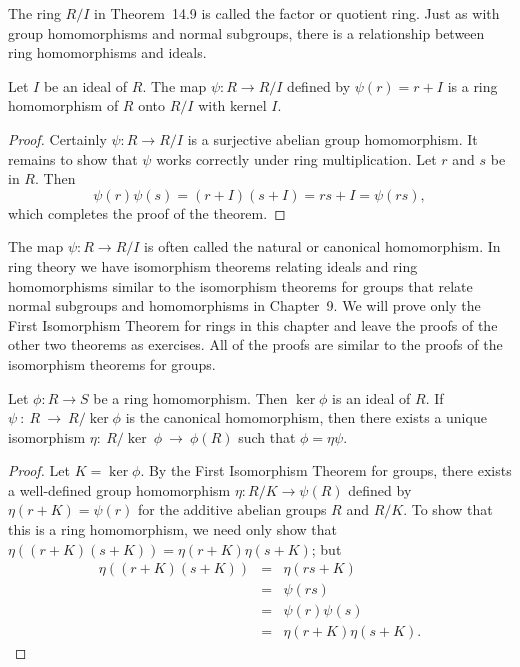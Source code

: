  
\medskip
 
 
The ring $R/I$ in Theorem~14.9 is called the {\bfi
factor\/} or {\bfi quotient
ring}. Just as with group homomorphisms and
normal subgroups, there is a relationship between ring homomorphisms
and ideals.  
 
 
\begin{theorem}
Let $I$ be an ideal of $R$. The map $\psi : R \rightarrow R/I$ defined
by $\psi( r ) = r + I$ is a ring homomorphism of $R$ onto $R/I$ with
kernel $I$.
\end{theorem}
 
 
\begin{proof}
Certainly $\psi : R \rightarrow R/I$ is a surjective abelian group
homomorphism. It remains to show that $\psi$ works correctly under
ring multiplication.  Let $r$ and $s$ be in $R$. Then
\[
\psi(r) \psi(s) = (r + I)(s+I) = rs + I = \psi(rs),
\]
which completes the proof of the theorem.
\end{proof}
 
 
\medskip
 
 
The map $\psi : R \rightarrow R/I$ is often called the {\bfi
natural\/} or {\bfi canonical
homomorphism}. In ring theory we have
isomorphism  theorems relating ideals and ring homomorphisms similar
to the isomorphism theorems for groups that relate normal subgroups
and homomorphisms in Chapter~9. We will prove only the First
Isomorphism Theorem for rings in this chapter and  leave the proofs of
the other two theorems as exercises. All of the proofs are similar to
the proofs of the isomorphism theorems for groups. 
 
 
\begin{theorem}
Let $\phi : R \rightarrow S$ be a ring homomorphism. Then $\ker \phi$
is an ideal of $R$. If $\psi~:~R~\rightarrow~R/\ker \phi$ is the
canonical homomorphism, then there exists a unique isomorphism
$\eta:~R/\ker~\phi~\rightarrow~\phi(R)$ such that $\phi = \eta \psi$. 
\end{theorem}
 
 
\begin{proof}
Let $K = \ker \phi$. By the First Isomorphism Theorem for groups, there
exists a well-defined group homomorphism $\eta: R/K \rightarrow
\psi(R)$ defined by $\eta(r + K) = \psi(r)$ for the additive abelian
groups $R$ and $R/K$.  To show that this is a ring homomorphism, we
need only show that $\eta( (r + K)(s + K) ) = \eta(r + K) \eta( s +
K)$; but
\begin{eqnarray*}
\eta( (r + K)( s +K )) & = & \eta(r s +K ) \\
& = & \psi(r s) \\
& = & \psi(r) \psi(s) \\
&= & \eta( r + K ) \eta( s + K ).
\end{eqnarray*}
\end{proof}
 
